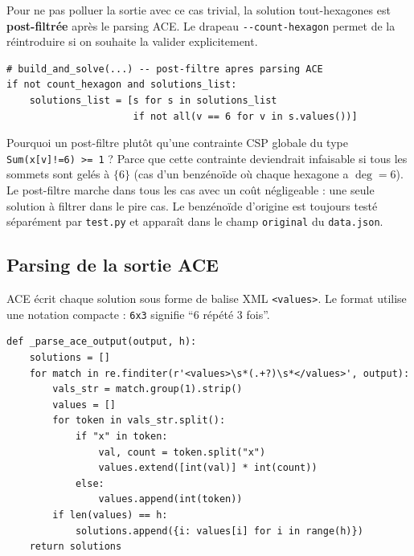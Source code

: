 Pour ne pas polluer la sortie avec ce cas trivial, la solution tout-hexagones est
\textbf{post-filtrée} après le parsing ACE. Le drapeau \texttt{-{}-count-hexagon}
permet de la réintroduire si on souhaite la valider explicitement.

\begin{lstlisting}
# build_and_solve(...) -- post-filtre apres parsing ACE
if not count_hexagon and solutions_list:
    solutions_list = [s for s in solutions_list
                      if not all(v == 6 for v in s.values())]
\end{lstlisting}

\begin{remarque}
  Pourquoi un post-filtre plutôt qu'une contrainte CSP globale du type
  \texttt{Sum(x[v]!=6) >= 1} ? Parce que cette contrainte deviendrait infaisable si
  tous les sommets sont gelés à $\{6\}$ (cas d'un benzénoïde où chaque hexagone a
  $\deg=6$). Le post-filtre marche dans tous les cas avec un coût négligeable :
  une seule solution à filtrer dans le pire cas. Le benzénoïde d'origine est
  toujours testé séparément par \texttt{test.py} et apparaît dans le champ
  \texttt{original} du \texttt{data.json}.
\end{remarque}

\subsection{Parsing de la sortie ACE}

ACE écrit chaque solution sous forme de balise XML \texttt{<values>}. Le format utilise
une notation compacte : \texttt{6x3} signifie ``6 répété 3 fois''.

\begin{lstlisting}
def _parse_ace_output(output, h):
    solutions = []
    for match in re.finditer(r'<values>\s*(.+?)\s*</values>', output):
        vals_str = match.group(1).strip()
        values = []
        for token in vals_str.split():
            if "x" in token:
                val, count = token.split("x")
                values.extend([int(val)] * int(count))
            else:
                values.append(int(token))
        if len(values) == h:
            solutions.append({i: values[i] for i in range(h)})
    return solutions
\end{lstlisting}
